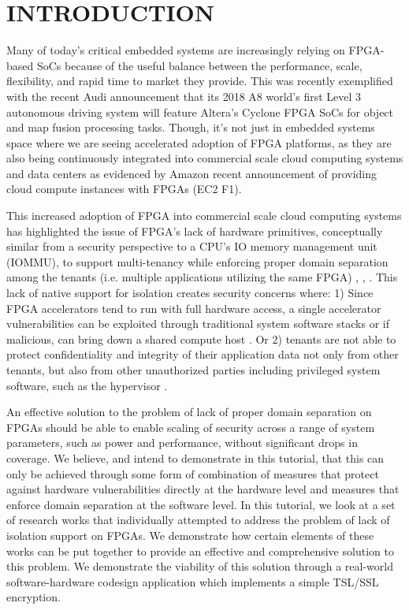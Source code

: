 \documentclass[sigconf]{acmart}
\theoremstyle{plain}
\theoremstyle{remark}
\begin{document}
\maketitle


\section{INTRODUCTION}\label{sec:intro}
Many of today's critical embedded systems are increasingly relying on FPGA-based SoCs because of the useful balance between the performance, scale, flexibility, and rapid time to market they provide. This was recently exemplified with the recent Audi announcement that its 2018 A8 world's first Level 3 autonomous driving system will feature Altera's Cyclone FPGA SoCs for object and map fusion processing tasks. Though, it's not just in embedded systems space where we are seeing accelerated adoption of FPGA platforms, as they are also being continuously integrated into commercial scale cloud computing systems and data centers as evidenced by Amazon recent announcement of providing cloud compute instances with FPGAs (EC2 F1).

This increased adoption of FPGA into commercial scale cloud computing systems has highlighted the issue of FPGA's lack of hardware primitives, conceptually similar from a security perspective to a CPU's IO memory management unit (IOMMU), to support multi-tenancy while enforcing proper domain separation among the tenants (i.e. multiple applications utilizing the same FPGA) \cite{CloudFPGA}, \cite{CapslHOST}, \cite{Byma2014FPGAsIT}. This lack of native support for isolation creates security concerns where: 1) Since FPGA accelerators tend to run with full hardware access, a single accelerator vulnerabilities can be exploited through traditional system software stacks or if malicious, can bring down a shared compute host \cite{CloudFPGA}. Or 2) tenants are not able to protect confidentiality and integrity of their application  data not only from other tenants, but also from other unauthorized parties including privileged system software, such as the hypervisor \cite{sconee}.

An effective solution to the problem of lack of proper domain separation on FPGAs should be able to enable scaling of security across a range of system parameters, such as power and performance, without significant drops in coverage. We believe, and intend to demonstrate in this tutorial, that this can only be achieved through some form of combination of measures that protect against hardware vulnerabilities directly at the hardware level and measures that enforce domain separation at the software level. In this tutorial, we look at a set of  research works that individually attempted to address the problem of lack of isolation support on FPGAs. We demonstrate how certain elements of these works can be put together to provide an effective and comprehensive solution to this problem. We demonstrate the viability of this solution through a real-world software-hardware codesign application which implements a simple TSL/SSL encryption.
\end{document}
